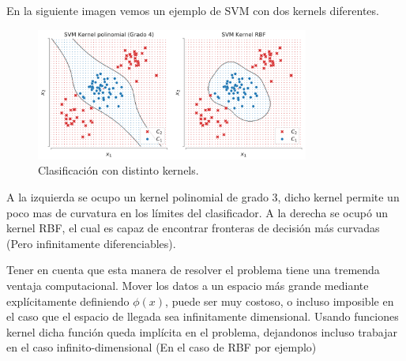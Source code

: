 En la siguiente imagen vemos un ejemplo de SVM con dos kernels diferentes.

\begin{figure}[ht]
    \centering
    \includegraphics[width=0.8\textwidth]{img/cap5_svm_2kernels}
    \caption{Clasificación con distinto kernels.}
    \label{im:ca5_im6}
\end{figure}

A la izquierda se ocupo un kernel polinomial de grado $3$, dicho kernel permite un poco mas de curvatura en los límites del clasificador. A la derecha se ocupó un kernel RBF, el cual es capaz de encontrar fronteras de decisión más curvadas (Pero infinitamente diferenciables). 

Tener en cuenta que esta manera de resolver el problema tiene una tremenda ventaja computacional. Mover los datos a un espacio más grande mediante explícitamente definiendo $\phi(x)$, puede ser muy costoso, o incluso imposible en el caso que el espacio de llegada sea infinitamente dimensional. Usando funciones kernel dicha función queda implícita en el problema, dejandonos incluso trabajar en el caso infinito-dimensional (En el caso de RBF por ejemplo)




